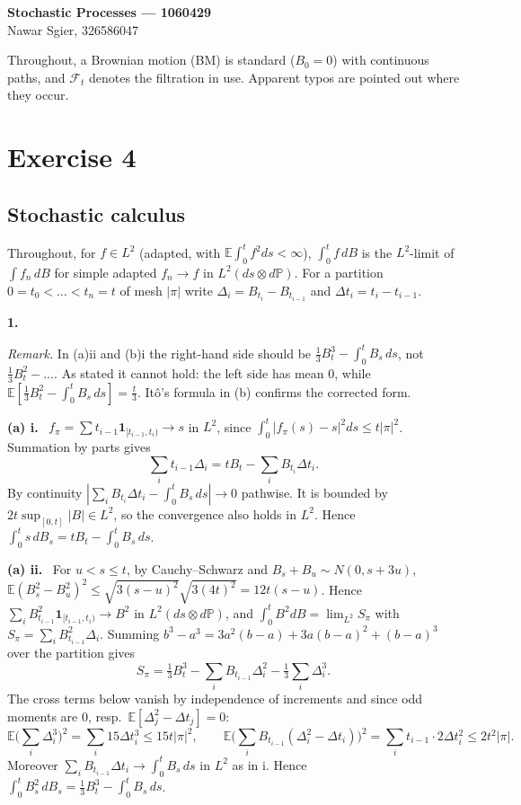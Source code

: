 \documentclass[11pt,a4paper]{article}
\newcommand{\E}{\mathbb{E}}
\renewcommand{\P}{\mathbb{P}}
\newcommand{\F}{\mathcal{F}}
\newcommand{\1}{\mathbf{1}}
\newcommand{\prob}[1]{\par\medskip\noindent\textbf{#1}\quad}
\newcommand{\sub}[1]{\par\smallskip\noindent\textbf{#1}\ }
\newcommand{\note}[1]{\par\noindent\emph{Remark.} #1}
\begin{document}
\begin{center}
{\large\textbf{Stochastic Processes --- 1060429}}\\[2pt]
Nawar Sgier, 326586047
\end{center}

\noindent Throughout, a Brownian motion (BM) is standard ($B_0=0$) with continuous paths, and
$\F_t$ denotes the filtration in use. Apparent typos are pointed out where they occur.

\section*{Exercise 4}
\subsection*{Stochastic calculus}

Throughout, for $f\in L^2$ (adapted, with $\E\int_0^tf^2ds<\infty$), $\int_0^tf\,dB$ is the $L^2$-limit of
$\int f_n\,dB$ for simple adapted $f_n\to f$ in $L^2(ds\otimes d\P)$. For a partition
$0=t_0<\dots<t_n=t$ of mesh $|\pi|$ write $\Delta_i=B_{t_i}-B_{t_{i-1}}$ and $\Delta t_i=t_i-t_{i-1}$.

\prob{1.}
\note{In (a)ii and (b)i the right-hand side should be $\frac13B_t^3-\int_0^tB_s\,ds$, not $\frac13B_t^2-\dots$.
As stated it cannot hold: the left side has mean $0$, while $\E[\frac13B_t^2-\int_0^tB_s\,ds]=\frac t3$.
Itô's formula in (b) confirms the corrected form.}

\sub{(a) i.} $f_\pi=\sum t_{i-1}\1_{[t_{i-1},t_i)}\to s$ in $L^2$, since $\int_0^t|f_\pi(s)-s|^2ds\le t|\pi|^2$. Summation by parts gives
\[
\sum_it_{i-1}\Delta_i=tB_t-\sum_iB_{t_i}\Delta t_i .
\]
By continuity $|\sum_iB_{t_i}\Delta t_i-\int_0^tB_s\,ds|\to0$ pathwise. It is bounded by $2t\sup_{[0,t]}|B|\in L^2$,
so the convergence also holds in $L^2$. Hence $\int_0^ts\,dB_s=tB_t-\int_0^tB_s\,ds$.

\sub{(a) ii.} For $u<s\le t$, by Cauchy--Schwarz and $B_s+B_u\sim N(0,s+3u)$,
$\E(B_s^2-B_u^2)^2\le\sqrt{3(s-u)^2}\sqrt{3(4t)^2}=12t(s-u)$. Hence
$\sum_iB_{t_{i-1}}^2\1_{[t_{i-1},t_i)}\to B^2$ in $L^2(ds\otimes d\P)$, and $\int_0^tB^2dB=\lim_{L^2}S_\pi$
with $S_\pi=\sum_iB_{t_{i-1}}^2\Delta_i$. Summing $b^3-a^3=3a^2(b-a)+3a(b-a)^2+(b-a)^3$ over the partition gives
\[
S_\pi=\tfrac13B_t^3-\sum_iB_{t_{i-1}}\Delta_i^2-\tfrac13\sum_i\Delta_i^3 .
\]
The cross terms below vanish by independence of increments and since odd moments are $0$, resp.\ $\E[\Delta_j^2-\Delta t_j]=0$:
\[
\E\Big(\sum_i\Delta_i^3\Big)^2=\sum_i15\Delta t_i^3\le15t|\pi|^2,\qquad
\E\Big(\sum_iB_{t_{i-1}}(\Delta_i^2-\Delta t_i)\Big)^2=\sum_it_{i-1}\cdot2\Delta t_i^2\le2t^2|\pi| .
\]
Moreover $\sum_iB_{t_{i-1}}\Delta t_i\to\int_0^tB_s\,ds$ in $L^2$ as in i. Hence
$\int_0^tB_s^2\,dB_s=\frac13B_t^3-\int_0^tB_s\,ds$.
\end{document}
